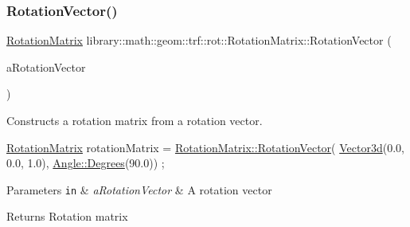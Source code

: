 \subsubsection{\texorpdfstring{Rotation\+Vector()}{RotationVector()}}
{\footnotesize\ttfamily \hyperlink{classlibrary_1_1math_1_1geom_1_1trf_1_1rot_1_1_rotation_matrix}{Rotation\+Matrix} library\+::math\+::geom\+::trf\+::rot\+::\+Rotation\+Matrix\+::\+Rotation\+Vector (\begin{DoxyParamCaption}\item[{const \hyperlink{classlibrary_1_1math_1_1geom_1_1trf_1_1rot_1_1_rotation_vector}{rot\+::\+Rotation\+Vector} \&}]{a\+Rotation\+Vector }\end{DoxyParamCaption})\hspace{0.3cm}{\ttfamily [static]}}



Constructs a rotation matrix from a rotation vector. 


\begin{DoxyCode}
\hyperlink{classlibrary_1_1math_1_1geom_1_1trf_1_1rot_1_1_rotation_matrix_a667d2c05aa5b0cc88775938d11164cdc}{RotationMatrix} rotationMatrix = \hyperlink{classlibrary_1_1math_1_1geom_1_1trf_1_1rot_1_1_rotation_matrix_aeace0bbd2b718443514a5f10aca3a904}{RotationMatrix::RotationVector}(
      \hyperlink{namespacelibrary_1_1math_1_1obj_a977e84e9bf317a4e7dd9d6d671d6da2f}{Vector3d}(0.0, 0.0, 1.0), \hyperlink{classlibrary_1_1math_1_1geom_1_1_angle_a64aa53e8420aeb6f671d86c65c370bc8}{Angle::Degrees}(90.0)) ;
\end{DoxyCode}



\begin{DoxyParams}[1]{Parameters}
\mbox{\tt in}  & {\em a\+Rotation\+Vector} & A rotation vector \\
\hline
\end{DoxyParams}
\begin{DoxyReturn}{Returns}
Rotation matrix 
\end{DoxyReturn}
\mbox{\label{classlibrary_1_1math_1_1geom_1_1trf_1_1rot_1_1_rotation_matrix_a25edc11452f7979746bed675e662eb2c}} 
